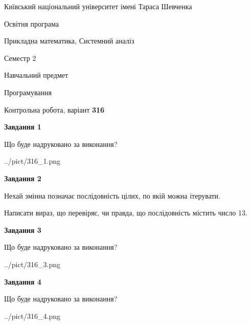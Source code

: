 \documentclass[12pt, ukrainian]{article}
\begin{document}
{{\begin {small}\par
{ \center  Київський національний університет імені Тараса Шевченка \par}
{\parbox {5 cm}{Освітня програма \hfill}{\parbox {8 cm}{Прикладна математика, Системний аналіз \hfill}}\parbox {5 cm}{\hfill Семестр 2}}\par
{\parbox {5 cm} {Навчальний предмет \hfill}\parbox {7 cm}{Програмування \hfill}\parbox {6cm}{\hfill}\par}\vspace{-7pt} \end{small}}{\center Контрольна робота, варіант  \No \textbf
{ 316 }\par}}
{
\begin {large}
{\begin {center}\textbf{Завдання 1}\end {center}}\par
Що буде надруковано за виконання?\par\par
\begin{center}
	{../pict/316_1.png}
\end{center}
\newpage

{\begin {center}\textbf{Завдання 2}\end {center}}\par
Нехай змінна  позначає послідовність цілих, по якій можна ітерувати.

Написати вираз, що перевіряє, чи правда, що послідовність  містить число 13.\par
\newpage

{\begin {center}\textbf{Завдання 3}\end {center}}\par
Що буде надруковано за виконання?
\begin{center}
	{../pict/316_3.png}
\end{center}
\newpage

{\begin {center}\textbf{Завдання 4}\end {center}}\par
Що буде надруковано за виконання?\par
\begin{center}
	{../pict/316_4.png}
\end{center}
\newpage


\end{large}}
\end{document}
